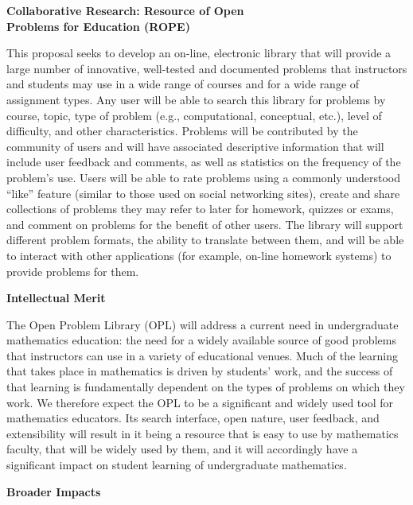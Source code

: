 \documentclass[11pt]{article}
\begin{document}
\begin{center}
{\Large \textbf{Collaborative Research: Resource of Open\\
Problems for Education (ROPE)}}
\end{center}

\bigskip
\noindent
This proposal seeks to develop an on-line, electronic library that will
provide a large number of innovative, well-tested and documented problems
that instructors and students may use in a wide range of courses and for a
wide range of assignment types.  Any user will be able to search this
library for problems by course, topic, type of problem (e.g.,
computational, conceptual, etc.), level of difficulty, and other
characteristics.  Problems will be contributed by the community of users
and will have associated descriptive information that will include user
feedback and comments, as well as statistics on the frequency of the
problem's use.  Users will be able to rate problems using a commonly
understood ``like'' feature (similar to those used on social networking
sites), create and share collections of problems they may refer to later
for homework, quizzes or exams, and comment on problems for the benefit of
other users.  The library will support different problem formats, the
ability to translate between them, and will be able to interact with other
applications (for example, on-line homework systems) to provide problems
for them.

\bigskip\bigskip
\noindent
{\large \textbf{Intellectual Merit}}

The Open Problem Library (OPL) will address a current need in
undergraduate mathematics education: the need for a widely available
source of good problems that instructors can use in a variety of
educational venues.  Much of the learning that takes place in mathematics
is driven by students' work, and the success of that learning is
fundamentally dependent on the types of problems on which they work.  We
therefore expect the OPL to be a significant and widely used tool for
mathematics educators.  Its search interface, open nature, user feedback,
and extensibility will result in it being a resource that is easy to use
by mathematics faculty, that will be widely used by them, and it will
accordingly have a significant impact on student learning of undergraduate
mathematics.

\bigskip\bigskip
\noindent
{\large \textbf{Broader Impacts}}
\end{document}
